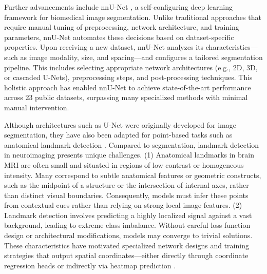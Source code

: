 Further advancements include nnU-Net \cite{Isensee2021-ev}, a self-configuring deep learning framework for biomedical image segmentation. Unlike traditional approaches that require manual tuning of preprocessing, network architecture, and training parameters, nnU-Net automates these decisions based on dataset-specific properties. Upon receiving a new dataset, nnU-Net analyzes its characteristics—such as image modality, size, and spacing—and configures a tailored segmentation pipeline. This includes selecting appropriate network architectures (e.g., 2D, 3D, or cascaded U-Nets), preprocessing steps, and post-processing techniques. This holistic approach has enabled nnU-Net to achieve state-of-the-art performance across 23 public datasets, surpassing many specialized methods with minimal manual intervention.

Although architectures such as U-Net were originally developed for image segmentation, they have also been adapted for point-based tasks such as anatomical landmark detection \cite{Ertl2025-wu,Chong2024-rp,Ye2023-wn}. Compared to segmentation, landmark detection in neuroimaging presents unique challenges. (1) Anatomical landmarks in brain MRI are often small and situated in regions of low contrast or homogeneous intensity. Many correspond to subtle anatomical features or geometric constructs, such as the midpoint of a structure or the intersection of internal axes, rather than distinct visual boundaries. Consequently, models must infer these points from contextual cues rather than relying on strong local image features. (2) Landmark detection involves predicting a highly localized signal against a vast background, leading to extreme class imbalance. Without careful loss function design or architectural modifications, models may converge to trivial solutions. These characteristics have motivated specialized network designs and training strategies that output spatial coordinates—either directly through coordinate regression heads \cite{Nibali2018-bu} or indirectly via heatmap prediction \cite{Payer2016-ik}.

